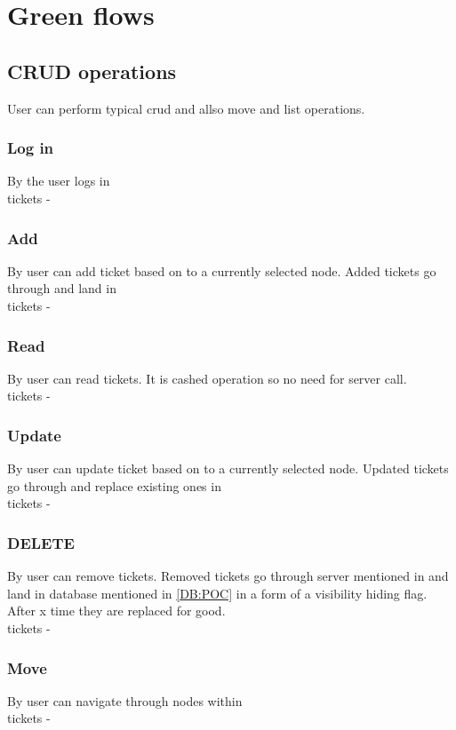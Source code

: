 
\section{Green flows}
\subsection{CRUD operations}\label{GF:CRUD}
User can perform typical crud and allso move and list operations.
\subsubsection{Log in}\label{GF:CRUD:LOGIN}
By the  user logs in \\
tickets - 
\subsubsection{Add}\label{GF:CRUD:ADD}
By  user can add ticket based on  
to a currently selected node. Added tickets go through  and land in \\
tickets - 
\subsubsection{Read}\label{GF:CRUD:READ}
By  user can read tickets. It is cashed operation so no need for server call.\\
tickets - 
\subsubsection{Update}\label{GF:CRUD:UP}
By  user can update ticket based on  
to a currently selected node. Updated tickets go through  and replace existing ones in \\
tickets - 
\subsubsection{DELETE}\label{GF:CRUD:DEL}
By  user can remove tickets. Removed tickets go through server mentioned 
in  and land in database mentioned in \ref{DB:POC} in a form of a visibility 
hiding flag. After x time they are replaced for good.\\
tickets - 
\subsubsection{Move}\label{GF:CRUD:MOV}
By  user can navigate through nodes within \\
tickets - 
